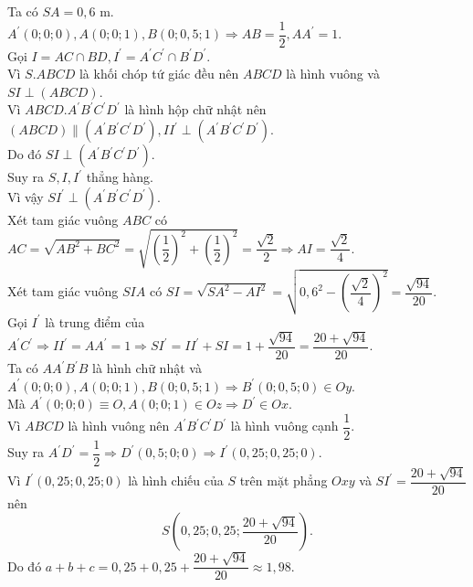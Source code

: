 \begin{bt}
{		 Ta có $S A=0{,}6$ m.\\
		$A^{\prime}(0; 0; 0), A(0; 0; 1), B(0; 0{,}5; 1) \Rightarrow A B=\dfrac{1}{2}, A A^{\prime}=1$.\\ 
		Gọi $I=A C  \cap B D, I^{\prime}=A^{\prime} C^{\prime} \cap B^{\prime} D^{\prime}$.\\
		Vì $S . A B C D$ là khối chóp tứ giác đều nên $A B C  D$ là hình vuông và $S I \perp(A B C D)$.\\
		Vì $A B C D . A^{\prime} B^{\prime} C^{\prime} D^{\prime}$ là hình hộp chữ nhật nên $(A B C  D) \parallel \left(A^{\prime} B^{\prime} C^{\prime} D^{\prime}\right), I I^{\prime} \perp\left(A^{\prime} B^{\prime} C^{\prime} D^{\prime}\right)$.\\
		Do đó $S I \perp\left(A^{\prime} B^{\prime} C^{\prime} D^{\prime}\right)$.  \\
		Suy ra $S,  I, I^{\prime}$ thẳng hàng.\\
		Vì vậy $S I^{\prime} \perp\left(A^{\prime} B^{\prime} C^{\prime} D^{\prime}\right)$.\\ 
		Xét tam giác vuông $A B  C$ có $A C=\sqrt{A B^{2}+B C^{2}}=\sqrt{\left(\dfrac{1}{2}\right)^{2}+\left(\dfrac{1}{2}\right)^{2}}=\dfrac{\sqrt{2}}{2} \Rightarrow A I=\dfrac{\sqrt{2}}{4}$.\\
		Xét tam giác vuông  $S I A$ có $S I=\sqrt{S A^{2}-A I^{2}}=\sqrt{0{,}6^{2}-\left(\dfrac{\sqrt{2}}{4}\right)^{2}}=\dfrac{\sqrt{94}}{20}$.\\
		Gọi $I^{\prime}$  là trung điểm của $A^{\prime} C^{\prime} \Rightarrow I I^{\prime}=A A^{\prime}=1 \Rightarrow S I^{\prime}=I I^{\prime}+S I=1+\dfrac{\sqrt{94}}{20}=\dfrac{20+\sqrt{94}}{20}$.\\
		Ta có $A A^{\prime} B^{\prime} B$ là hình chữ nhật và $A^{\prime}(0; 0; 0), A(0; 0; 1), B(0; 0{,}5; 1) \Rightarrow B^{\prime}(0; 0{,}5; 0)  \in O y$.\\
		Mà $A^{\prime}(0; 0; 0) \equiv O, A(0; 0; 1) \in O z \Rightarrow D^{\prime} \in Ox$.\\ 
		Vì $A B C D$ là hình vuông nên $A^{\prime} B^{\prime} C^{\prime} D^{\prime}$ là hình  vuông cạnh $\dfrac{1}{2}$.\\
		Suy  ra $A^{\prime} D^{\prime}=\dfrac{1}{2} \Rightarrow D^{\prime}(0{,}5; 0; 0) \Rightarrow I^{\prime}(0{,}25; 0{,}25; 0)$.\\
		Vì $I^{\prime}(0{,}25; 0{,}25; 0)$ là hình chiếu của $S$ trên mặt phẳng  $Oxy$ và $S I^{\prime}=\dfrac{20+\sqrt{94}}{20}$ nên $$ S\left(0{,}25; 0{,}25; \dfrac{20+\sqrt{94}}{20}\right).$$
	Do đó $ a+b+c=0{,}25+0{,}25+\dfrac{20+\sqrt{94}}{20}  \approx 1{,}98$.}
\end{bt}

